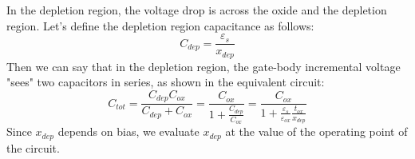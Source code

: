 In the depletion region, the voltage drop is across the oxide and the depletion region.  Let's define the depletion region capacitance as follows:
    \begin{equation}
        {C_{dep}} = \frac{{{\varepsilon _s}}}{{{x_{dep}}}}
    \end{equation}
Then we can say that in the depletion region, the gate-body incremental voltage "sees" two capacitors in series, as shown in the equivalent circuit:
    \begin{equation}
        {C_{tot}} = \frac{{{C_{dep}}{C_{ox}}}}{{{C_{dep}} + {C_{ox}}}} = \frac{{{C_{ox}}}}{{1 + \frac{{{C_{dep}}}}{{{C_{ox}}}}}} = \frac{{{C_{ox}}}}{{1 + \frac{{{\varepsilon _s}}}{{{\varepsilon _{ox}}}}\frac{{{t_{ox}}}}{{{x_{dep}}}}}}
    \end{equation}
Since $x_{dep}$ depends on bias, we evaluate $x_{dep}$ at the value of the operating point of the circuit.  
